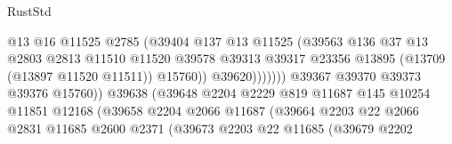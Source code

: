 \begin{lexlean}{RustStd}
\begin{coremodule}
                                              @13
                                              @16
                                              @11525
                                              @2785
                                              (@39404
                                                @137
                                                @13
                                                @11525
                                                (@39563
                                                  @136
                                                  @37
                                                  @13
                                                  @2803
                                                  @2813
                                                  @11510
                                                  @11520
                                                  @39578
                                                  @39313
                                                  @39317
                                                  @23356
                                                  @13895
                                                  (@13709 (@13897 @11520 @11511))
                                                  @15760))
                                              @39620)))))))
                                @39367
                                @39370
                                @39373
                                @39376
                                @15760))
                            @39638
                            (@39648
                              @2204
                              @2229
                              @819
                              @11687
                              @145
                              @10254
                              @11851
                              @12168
                              (@39658
                                @2204
                                @2066
                                @11687
                                (@39664
                                  @2203
                                  @22
                                  @2066
                                  @2831
                                  @11685
                                  @2600
                                  @2371
                                  (@39673
                                    @2203
                                    @22
                                    @11685
                                    (@39679
                                      @2202

\end{coremodule}
\end{lexlean}
